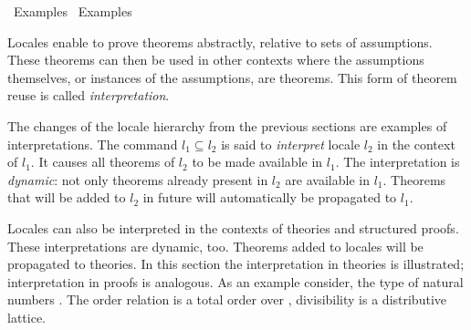 %
\begin{isabellebody}%
\def\isabellecontext{Examples{\isadigit{1}}}%
%
\isadelimtheory
\isanewline
\isanewline
%
\endisadelimtheory
%
\isatagtheory
{}\isamarkupfalse%
\ Examples{}\isanewline
{}\ Examples\isanewline
{}%
\endisatagtheory
{\isafoldtheory}%
%
\isadelimtheory
%
\endisadelimtheory
%
\isamarkuptrue%
%
\begin{isamarkuptext}%
Locales enable to prove theorems abstractly, relative to
  sets of assumptions.  These theorems can then be used in other
  contexts where the assumptions themselves, or
  instances of the assumptions, are theorems.  This form of theorem
  reuse is called \emph{interpretation}.

  The changes of the locale
  hierarchy from the previous sections are examples of
  interpretations.  The command  $l_1
  \subseteq l_2$ is said to \emph{interpret} locale $l_2$ in the
  context of $l_1$.  It causes all theorems of $l_2$ to be made
  available in $l_1$.  The interpretation is \emph{dynamic}: not only
  theorems already present in $l_2$ are available in $l_1$.  Theorems
  that will be added to $l_2$ in future will automatically be
  propagated to $l_1$.

  Locales can also be interpreted in the contexts of theories and
  structured proofs.  These interpretations are dynamic, too.
  Theorems added to locales will be propagated to theories.
  In this section the interpretation in
  theories is illustrated; interpretation in proofs is analogous.
  As an example consider, the type of natural numbers .  The
  order relation \isa{{\isasymle}} is a total order over ,
  divisibility  is a distributive lattice.


\end{isamarkuptext}
\end{isabellebody}

